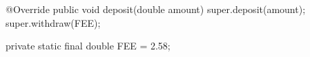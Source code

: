 \begin{unipdcode}[language=Java]
@Override
public void deposit(double amount) {
    super.deposit(amount);
    super.withdraw(FEE);
}

private static final double FEE = 2.58;
\end{unipdcode}
